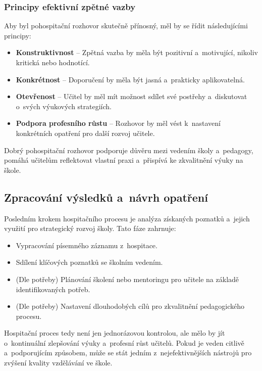 \subsubsection{Principy efektivní zpětné vazby}
Aby byl pohospitační rozhovor skutečně přínosný, měl by se řídit následujícími principy:
\begin{itemize}
    \item \textbf{Konstruktivnost} – Zpětná vazba by měla být pozitivní a~motivující, nikoliv kritická nebo hodnotící.
    \item \textbf{Konkrétnost} – Doporučení by měla být jasná a~prakticky aplikovatelná.
    \item \textbf{Otevřenost} – Učitel by měl mít možnost sdílet své postřehy a~diskutovat o~svých výukových strategiích.
    \item \textbf{Podpora profesního růstu} – Rozhovor by měl vést k~nastavení konkrétních opatření pro další rozvoj učitele.
\end{itemize}

Dobrý pohospitační rozhovor podporuje důvěru mezi vedením školy a~pedagogy, pomáhá učitelům reflektovat vlastní praxi a~přispívá ke zkvalitnění výuky na škole.

\subsection{Zpracování výsledků a~návrh opatření}

Posledním krokem hospitačního procesu je analýza získaných poznatků a~jejich využití pro strategický rozvoj školy. Tato fáze zahrnuje:

\begin{itemize}
    \item Vypracování písemného záznamu z~hospitace.
    \item Sdílení klíčových poznatků se školním vedením.
    \item (Dle potřeby) Plánování školení nebo mentoringu pro učitele na základě identifikovaných potřeb.
    \item (Dle potřeby) Nastavení dlouhodobých cílů pro zkvalitnění pedagogického procesu.
\end{itemize}

Hospitační proces tedy není jen jednorázovou kontrolou, ale mělo by jít o~kontinuální zlepšování výuky a~profesní růst učitelů. Pokud je veden citlivě a~podporujícím způsobem, může se stát jedním z~nejefektivnějších nástrojů pro zvýšení kvality vzdělávání ve škole.

